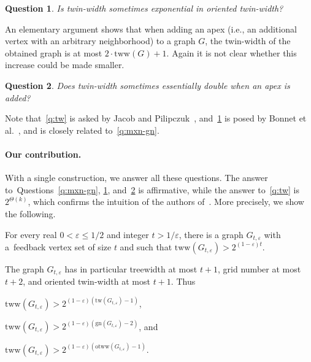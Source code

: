 \documentclass[a4paper,UKenglish,cleveref,hyperref,autoref]{lipics-v2021}
\newtheorem{question}{Question}%
\newcommand{\tww}{\text{tww}}
\newcommand{\otww}{\text{otww}}
\newcommand{\tw}{\text{tw}}
\newcommand{\gn}{\text{gn}}
\begin{document}
\begin{question}\label{q:otww}
 Is twin-width sometimes exponential in oriented twin-width?
\end{question}

An elementary argument shows that when adding an apex (i.e., an additional vertex with an arbitrary neighborhood) to a graph $G$, the twin-width of the obtained graph is at most $2 \cdot \tww(G) + 1$.
Again it is not clear whether this increase could be made smaller.  

\begin{question}\label{q:apex}
 Does twin-width sometimes essentially double when an apex is added? 
\end{question}

Note that~\cref{q:tw} is asked by Jacob and Pilipczuk~\cite{Jacob22}, and~\cref{q:otww} is posed by Bonnet et al.~\cite{twin-width6}, and is closely related to~\cref{q:mxn-gn}.

\paragraph*{Our contribution.}
With a single construction, we answer all these questions.
The answer to~Questions~\ref{q:mxn-gn}, \ref{q:otww}, and~\ref{q:apex} is affirmative, while the answer to~\cref{q:tw} is $2^{\Theta(k)}$, which confirms the intuition of the authors of~\cite{Jacob22}. 
More precisely, we show the following.
 
\begin{theorem}\label{thm:main}
  For every real $0 < \varepsilon \leqslant 1/2$ and integer $t>1/\varepsilon$, there is a graph $G_{t,\varepsilon}$ with a~feedback vertex set of size $t$ and such that $\tww(G_{t,\varepsilon}) > 2^{(1-\varepsilon)t}$.
\end{theorem}
The graph $G_{t,\varepsilon}$ has in particular treewidth at most $t+1$, grid number at most $t+2$, and oriented twin-width at most $t+1$.
Thus
\begin{compactitem}
\item $\tww(G_{t,\varepsilon}) > 2^{(1-\varepsilon)(\tw(G_{t,\varepsilon}) - 1)}$,
\item $\tww(G_{t,\varepsilon}) > 2^{(1-\varepsilon)(\gn(G_{t,\varepsilon}) - 2)}$, and 
\item $\tww(G_{t,\varepsilon}) > 2^{(1-\varepsilon)(\otww(G_{t,\varepsilon}) - 1)}$.
\end{compactitem}
\end{document}
